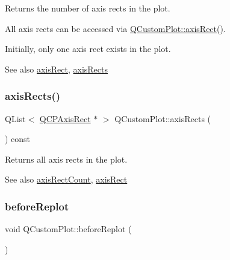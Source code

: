 Returns the number of axis rects in the plot.

All axis rects can be accessed via \hyperlink{class_q_custom_plot_ae5eefcb5f6ca26689b1fd4f6e25b42f9}{Q\+Custom\+Plot\+::axis\+Rect()}.

Initially, only one axis rect exists in the plot.

\begin{DoxySeeAlso}{See also}
\hyperlink{class_q_custom_plot_ae5eefcb5f6ca26689b1fd4f6e25b42f9}{axis\+Rect}, \hyperlink{class_q_custom_plot_a12af771429e2d7e313c8c5d5fca068fe}{axis\+Rects} 
\end{DoxySeeAlso}
\hypertarget{class_q_custom_plot_a12af771429e2d7e313c8c5d5fca068fe}{}\label{class_q_custom_plot_a12af771429e2d7e313c8c5d5fca068fe} 
\subsubsection{\texorpdfstring{axis\+Rects()}{axisRects()}}
{\footnotesize\ttfamily Q\+List$<$ \hyperlink{class_q_c_p_axis_rect}{Q\+C\+P\+Axis\+Rect} $\ast$ $>$ Q\+Custom\+Plot\+::axis\+Rects (\begin{DoxyParamCaption}{ }\end{DoxyParamCaption}) const}

Returns all axis rects in the plot.

\begin{DoxySeeAlso}{See also}
\hyperlink{class_q_custom_plot_a8f85940aaac50efb466287d9d2d04ec6}{axis\+Rect\+Count}, \hyperlink{class_q_custom_plot_ae5eefcb5f6ca26689b1fd4f6e25b42f9}{axis\+Rect} 
\end{DoxySeeAlso}
\hypertarget{class_q_custom_plot_a0cd30e29b73efd6afe096e44bc5956f5}{}\label{class_q_custom_plot_a0cd30e29b73efd6afe096e44bc5956f5} 
\subsubsection{\texorpdfstring{before\+Replot}{beforeReplot}}
{\footnotesize\ttfamily void Q\+Custom\+Plot\+::before\+Replot (\begin{DoxyParamCaption}{ }\end{DoxyParamCaption})\hspace{0.3cm}{\ttfamily [signal]}}

